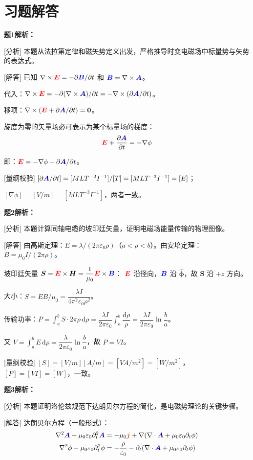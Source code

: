 \documentclass[11pt,a4paper,openany,oneside]{book}
\newcommand{\diff}{\mathrm{d}}
\newcommand{\vecE}{\textcolor{red}{\vect{E}}}
\newcommand{\vecB}{\textcolor{blue}{\vect{B}}}
\newcommand{\vecJ}{\textcolor{cororange}{\vect{j}}}
\newcommand{\vecA}{\textcolor{blue!70!black}{\vect{A}}}
\newcommand{\eps}{\varepsilon}
\newcommand{\muz}{\mu_0}
\newcommand{\vect}[1]{\bm{#1}}
\newcommand{\unitvec}[1]{\hat{\vect{#1}}}
\newcommand{\grad}{\nabla}
\newcommand{\curl}{\nabla\times}
\newcommand{\divg}{\nabla\cdot}
\newcommand{\lap}{\nabla^2}
\begin{document}
\section*{习题解答}

\textbf{题1解析：}

[分析] 本题从法拉第定律和磁矢势定义出发，严格推导时变电磁场中标量势与矢势的表达式。

[解答] 已知 $\curl\vecE = -\partial\vecB/\partial t$ 和 $\vecB = \curl\vecA$。

代入：$\curl\vecE = -\partial(\curl\vecA)/\partial t = -\curl(\partial\vecA/\partial t)$。

移项：$\curl(\vecE + \partial\vecA/\partial t) = \vect{0}$。

旋度为零的矢量场必可表示为某个标量场的梯度：
\[
\vecE + \frac{\partial\vecA}{\partial t} = -\grad\phi
\]

即：$\vecE = -\grad\phi - \partial\vecA/\partial t$。\qedsymbol

[量纲校验] $[\partial\vecA/\partial t] = [MLT^{-2}I^{-1}]/[T] = [MLT^{-3}I^{-1}] = [E]$；

$[\grad\phi] = [V/m] = [MLT^{-3}I^{-1}]$，两者一致。\qedsymbol

\textbf{题2解析：}

[分析] 本题计算同轴电缆的坡印廷矢量，证明电磁场能量传输的物理图像。

[解答] 由高斯定理：$E = \lambda/(2\pi\eps_0\rho)$（$a < \rho < b$）。由安培定理：$B = \muz I/(2\pi\rho)$。

坡印廷矢量 $\vect{S} = \vecE\times\vect{H} = \dfrac{1}{\muz}\vecE\times\vecB$：
$\vecE$ 沿径向，$\vecB$ 沿 $\unitvec{\phi}$，故 $\vect{S}$ 沿 $+z$ 方向。

大小：$S = EB/\muz = \dfrac{\lambda I}{4\pi^2\eps_0\rho^2}$。

传输功率：$P = \int_a^b S \cdot 2\pi\rho\,\diff\rho = \dfrac{\lambda I}{2\pi\eps_0}\int_a^b \dfrac{\diff\rho}{\rho} = \dfrac{\lambda I}{2\pi\eps_0}\ln\dfrac{b}{a}$。

又 $V = \int_a^b E\,\diff\rho = \dfrac{\lambda}{2\pi\eps_0}\ln\dfrac{b}{a}$，故 $P = VI$。\qedsymbol

[量纲校验] $[S] = [V/m][A/m] = [VA/m^2] = [W/m^2]$，$[P] = [VI] = [W]$，一致。\qedsymbol

\textbf{题3解析：}

[分析] 本题证明洛伦兹规范下达朗贝尔方程的简化，是电磁势理论的关键步骤。

[解答] 达朗贝尔方程（一般形式）：
\begin{align*}
\lap\vecA - \muz\eps_0\partial_t^2\vecA &= -\muz\vecJ + \grad(\divg\vecA + \muz\eps_0\partial_t\phi) \\
\lap\phi - \muz\eps_0\partial_t^2\phi &= -\frac{\rho}{\eps_0} - \partial_t(\divg\vecA + \muz\eps_0\partial_t\phi)
\end{align*}
\end{document}
